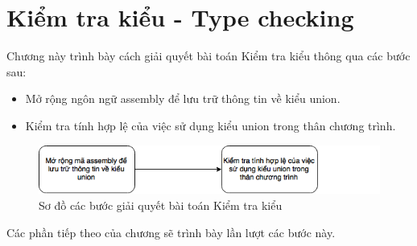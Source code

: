 \chapter{Kiểm tra kiểu - Type checking}
\label{chap:typechecking}
Chương này trình bày cách giải quyết bài toán Kiểm tra kiểu thông qua các bước sau:
\begin{itemize}
\item Mở rộng ngôn ngữ assembly để lưu trữ thông tin về kiểu union.
\item Kiểm tra tính hợp lệ của việc sử dụng kiểu union trong thân chương trình.
\end{itemize}
\begin{figure}[h!]
	\centering
	\includegraphics[width=\linewidth]{image/soDoTypeChecking}
	\caption{Sơ đồ các bước giải quyết bài toán Kiểm tra kiểu}
	\label{fig:sodotypechecking}
\end{figure}

Các phần tiếp theo của chương sẽ trình bày lần lượt các bước này.

